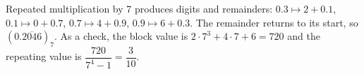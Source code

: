Repeated multiplication by 7 produces digits and remainders: $ 0.3\mapsto2+0.1 $, $ 0.1\mapsto0+0.7 $, $ 0.7\mapsto4+0.9 $, $ 0.9\mapsto6+0.3 $. The remainder returns to its start, so $\boxed{(0.\overline{2046})_7}$. As a check, the block value is $ 2\cdot7^3+4\cdot7+6=720 $ and the repeating value is $\dfrac{720}{7^4-1}=\dfrac{3}{10}$.
